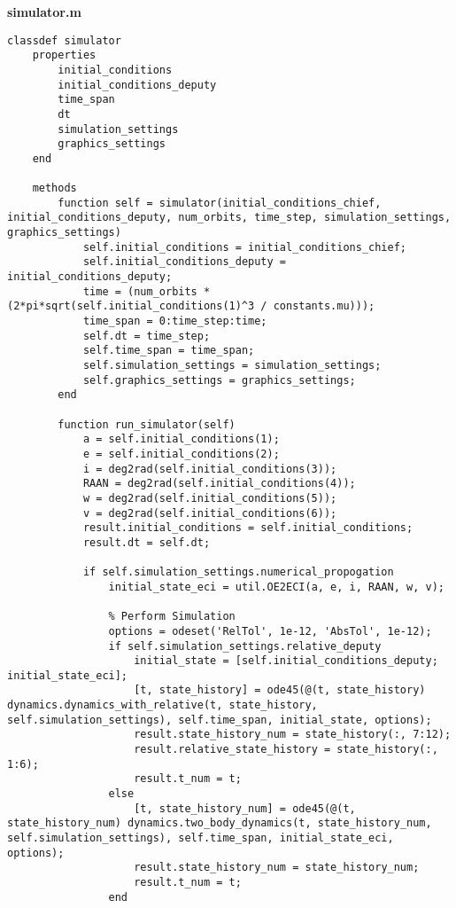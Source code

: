\textbf{simulator.m}
\begin{lstlisting}
classdef simulator
    properties
        initial_conditions
        initial_conditions_deputy
        time_span
        dt
        simulation_settings
        graphics_settings
    end

    methods
        function self = simulator(initial_conditions_chief, initial_conditions_deputy, num_orbits, time_step, simulation_settings, graphics_settings)
            self.initial_conditions = initial_conditions_chief;
            self.initial_conditions_deputy = initial_conditions_deputy;
            time = (num_orbits * (2*pi*sqrt(self.initial_conditions(1)^3 / constants.mu)));
            time_span = 0:time_step:time;
            self.dt = time_step;
            self.time_span = time_span;
            self.simulation_settings = simulation_settings;
            self.graphics_settings = graphics_settings;
        end

        function run_simulator(self)
            a = self.initial_conditions(1);
            e = self.initial_conditions(2);
            i = deg2rad(self.initial_conditions(3));
            RAAN = deg2rad(self.initial_conditions(4));
            w = deg2rad(self.initial_conditions(5));
            v = deg2rad(self.initial_conditions(6));
            result.initial_conditions = self.initial_conditions;
            result.dt = self.dt;

            if self.simulation_settings.numerical_propogation
                initial_state_eci = util.OE2ECI(a, e, i, RAAN, w, v);

                % Perform Simulation
                options = odeset('RelTol', 1e-12, 'AbsTol', 1e-12);
                if self.simulation_settings.relative_deputy
                    initial_state = [self.initial_conditions_deputy; initial_state_eci];
                    [t, state_history] = ode45(@(t, state_history) dynamics.dynamics_with_relative(t, state_history, self.simulation_settings), self.time_span, initial_state, options);
                    result.state_history_num = state_history(:, 7:12);
                    result.relative_state_history = state_history(:, 1:6);
                    result.t_num = t;
                else
                    [t, state_history_num] = ode45(@(t, state_history_num) dynamics.two_body_dynamics(t, state_history_num, self.simulation_settings), self.time_span, initial_state_eci, options);
                    result.state_history_num = state_history_num;
                    result.t_num = t;
                end


\end{lstlisting}
